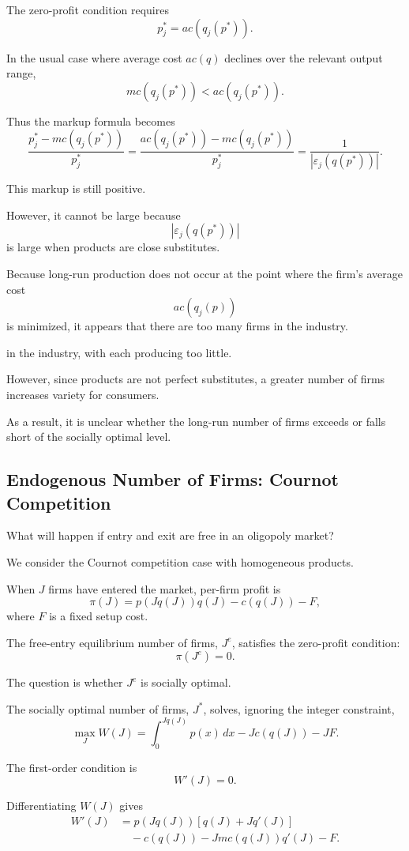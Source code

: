 The zero-profit condition requires
\[
p_j^*
=
ac(q_j(p^*)).
\]

In the usual case where average cost \(ac(q)\) declines over the relevant output range,
\[
mc(q_j(p^*))<ac(q_j(p^*)).
\]

Thus the markup formula becomes
\[
\frac{
p_j^*-mc(q_j(p^*))
}{
p_j^*
}
=
\frac{
ac(q_j(p^*))-mc(q_j(p^*))
}{
p_j^*
}
=
\frac{1}{|\varepsilon_j(q(p^*))|}.
\]

This markup is still positive.

However, it cannot be large because
\[
|\varepsilon_j(q(p^*))|
\]
is large when products are close substitutes.

Because long-run production does not occur at the point where the firm's average cost
\[
ac(q_j(p))
\]
is minimized, it appears that there are too many firms in the industry.



in the industry, with each producing too little.

However, since products are not perfect substitutes, a greater number of firms increases variety for consumers.

As a result, it is unclear whether the long-run number of firms exceeds or falls short of the socially optimal level.

\subsection{Endogenous Number of Firms: Cournot Competition}

What will happen if entry and exit are free in an oligopoly market?

We consider the Cournot competition case with homogeneous products.

When \(J\) firms have entered the market, per-firm profit is
\[
\pi(J)
=
p(Jq(J))q(J)-c(q(J))-F,
\]
where \(F\) is a fixed setup cost.

The free-entry equilibrium number of firms, \(J^e\), satisfies the zero-profit condition:
\[
\pi(J^e)=0.
\]

The question is whether \(J^e\) is socially optimal.

The socially optimal number of firms, \(J^*\), solves, ignoring the integer constraint,
\[
\max_J W(J)
=
\int_0^{Jq(J)}p(x)\,dx
-
Jc(q(J))
-
JF.
\]

The first-order condition is
\[
W'(J)=0.
\]

Differentiating \(W(J)\) gives
\[
\begin{aligned}
W'(J)
&=
p(Jq(J))
\left[
q(J)+Jq'(J)
\right] \\
&\quad
-
c(q(J))
-
Jmc(q(J))q'(J)
-
F.
\end{aligned}
\]

